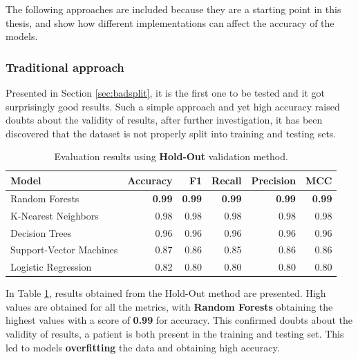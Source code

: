             The following approaches are included because they are a starting point in this thesis, and show how different implementations can affect the accuracy of the models.
            
            \subsubsection{Traditional approach}
                
                Presented in Section \ref{sec:badsplit}, it is the first one to be tested and it got surprisingly good results. Such a simple approach and yet high accuracy raised doubts about the validity of results, after further investigation, it has been discovered that the dataset is not properly split into training and testing sets. 
            
                \begin{table}[htbp]
                    \centering
                    \begin{tabular}{lrrrrr}
                        \toprule
                        \textbf{Model} & \textbf{Accuracy} & \textbf{F1} & \textbf{Recall} & \textbf{Precision} & \textbf{MCC} \\
                        \midrule
                        Random Forests & \textbf{0.99} & \textbf{0.99} & \textbf{0.99} & \textbf{0.99} & \textbf{0.99} \\
                        K-Nearest Neighbors & 0.98 & 0.98 & 0.98 & 0.98 & 0.98 \\
                        Decision Trees & 0.96 & 0.96 & 0.96 & 0.96 & 0.96 \\
                        Support-Vector Machines & 0.87 & 0.86 & 0.85 & 0.86 & 0.86 \\
                        Logistic Regression & 0.82 & 0.80 & 0.80 & 0.80 & 0.80 \\
                        \bottomrule
                    \end{tabular}
                    \caption{Evaluation results using \textbf{Hold-Out} validation method.}
                    \label{tab:wrong_approach_holdout}
                \end{table}

                In Table \ref{tab:wrong_approach_holdout}, results obtained from the Hold-Out method are presented. High values are obtained for all the metrics, with \textbf{Random Forests} obtaining the highest values with a score of \textbf{0.99} for accuracy. This confirmed doubts about the validity of results, a patient is both present in the training and testing set. This led to models \textbf{overfitting} the data and obtaining high accuracy.

